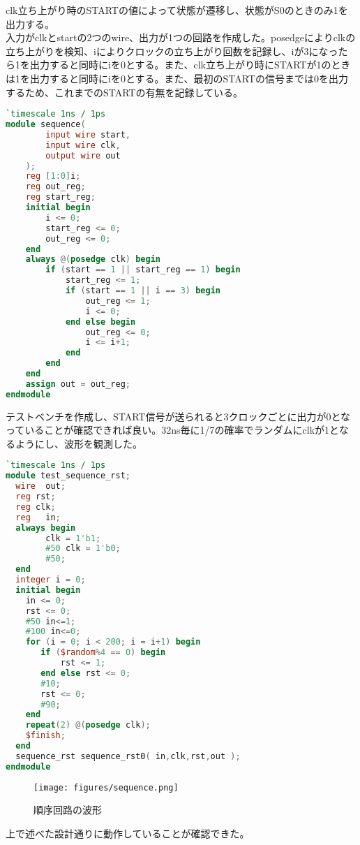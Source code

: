 \documentclass[titlepage]{ltjsarticle}
\begin{document}
clk立ち上がり時のSTARTの値によって状態が遷移し、状態がS0のときのみ1を出力する。\\
入力がclkとstartの2つのwire、出力が1つの回路を作成した。posedgeによりclkの立ち上がりを検知、iによりクロックの立ち上がり回数を記録し、iが3になったら1を出力すると同時にiを0とする。また、clk立ち上がり時にSTARTが1のときは1を出力すると同時にiを0とする。また、最初のSTARTの信号までは0を出力するため、これまでのSTARTの有無を記録している。
\begin{lstlisting}[caption=順序回路デザイン,language=verilog]
`timescale 1ns / 1ps
module sequence(
        input wire start,
        input wire clk,
        output wire out
    );
    reg [1:0]i;
    reg out_reg;
    reg start_reg;
    initial begin
        i <= 0;
        start_reg <= 0;
        out_reg <= 0;
    end
    always @(posedge clk) begin
        if (start == 1 || start_reg == 1) begin
            start_reg <= 1;
            if (start == 1 || i == 3) begin 
                out_reg <= 1;
                i <= 0;
            end else begin
                out_reg <= 0;
                i <= i+1;
            end
        end
    end
    assign out = out_reg;
endmodule
\end{lstlisting}
テストベンチを作成し、START信号が送られると3クロックごとに出力が0となっていることが確認できれば良い。32ns毎に1/7の確率でランダムにclkが1となるようにし、波形を観測した。
\begin{lstlisting}[caption=順序回路テストベンチ,language=verilog]
`timescale 1ns / 1ps
module test_sequence_rst;
  wire	out;
  reg rst;
  reg clk;
  reg	in;
  always begin
        clk = 1'b1;
        #50 clk = 1'b0;
        #50;
  end
  integer i = 0;
  initial begin
	in <= 0;
	rst <= 0;
	#50 in<=1;
	#100 in<=0;
	for (i = 0; i < 200; i = i+1) begin
	   if ($random%4 == 0) begin
	       rst <= 1;
	   end else rst <= 0;
	   #10;
	   rst <= 0;
	   #90;
	end
	repeat(2) @(posedge clk);
	$finish;
  end
  sequence_rst sequence_rst0( in,clk,rst,out );
endmodule
\end{lstlisting}
\begin{figure}[H]
    \begin{center}
        \texttt{[image: figures/sequence.png]}
        \caption{順序回路の波形}
    \end{center}
\end{figure}
上で述べた設計通りに動作していることが確認できた。
\end{document}
